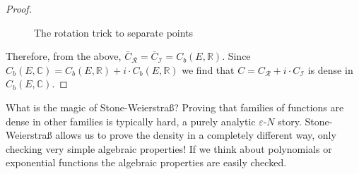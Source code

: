 \begin{proof}[Proof]
\begin{figure}[h]
\begin{center}
  \caption*{The rotation trick to separate points}
\end{center}
\end{figure}
	

	Therefore, from the above, $\bar{C}_{\mathcal R} = \bar{C}_{\mathcal I} = C_b(E,\mathbb{R})$. Since $C_b(E, \mathbb{C}) = C_b(E,\mathbb{R}) + i \cdot C_b(E,\mathbb{R})$ we find that $C = C_{\mathcal{R}} + i \cdot C_{\mathcal{I}}$ is dense in $C_b(E, \mathbb{C})$.
\end{proof}
What is the magic of Stone-Weierstra\ss? Proving that families of functions are dense in other families is typically hard, a purely analytic $\varepsilon$-$N$ story. Stone-Weierstra\ss{} allows us to prove the density in a completely different way, only checking very simple algebraic properties! If we think about polynomials or exponential functions the algebraic properties are easily checked.\smallskip
\marginpar{\textcolor{red}{Lecture 15}}

